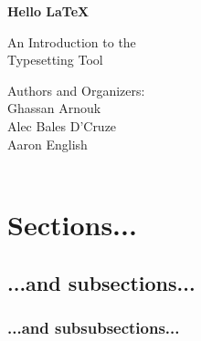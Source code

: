 \documentclass[titlepage, hidelinks, 12pt]{article}%
\begin{document}
    \begin{titlepage}
        \begin{center}
            \vspace*{1cm}
            \Huge
            \textbf{Hello \LaTeX}

            \vspace{0.5cm}
            \LARGE
            An Introduction to the\\
            Typesetting Tool
            \vfill
        \end{center}
        \begin{flushright}
            Authors and Organizers:\\
            Ghassan Arnouk\\
            Alec Bales D'Cruze\\
            Aaron English\\
            \\
        \end{flushright}
    \end{titlepage}

    \tableofcontents
    \clearpage
    
    \section{Sections...}
        \subsection{...and subsections...}
            \subsubsection{...and subsubsections...}
\end{document}
